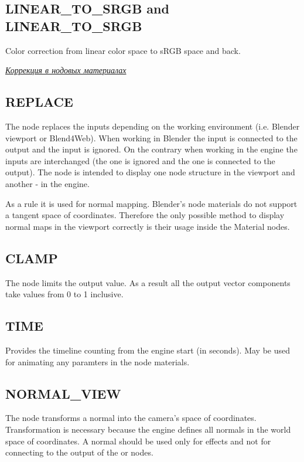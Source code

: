 \documentclass[a4paper,12pt,oneside]{sphinxmanual}
\begin{document}
\subsection{LINEAR\_TO\_SRGB and LINEAR\_TO\_SRGB}
\label{node_materials:linear-to-srgb-linear-to-srgb}
Color correction from linear color space to sRGB space and back.




{\hyperref[gamma_alpha:gamma-nodes]{\emph{Коррекция в нодовых материалах}}}




\subsection{REPLACE}
\label{node_materials:replace}
The node replaces the inputs depending on the working environment (i.e. Blender viewport or Blend4Web). When working in Blender the  input is connected to the  output and the  input is ignored. On the contrary when working in the engine the inputs are interchanged (the  one is ignored and the  one is connected to the output). The node is intended to display one node structure in the viewport and another - in the engine.

As a rule it is used for normal mapping. Blender's node materials do not support a tangent space of coordinates. Therefore the only possible method to display normal maps in the viewport correctly is their usage inside the Material nodes.


\subsection{CLAMP}
\label{node_materials:clamp}
The node limits the output value. As a result all the output vector components take values from 0 to 1 inclusive.


\subsection{TIME}
\label{node_materials:time}
Provides the timeline counting from the engine start (in seconds). May be used for animating any paramters in the node materials.


\subsection{NORMAL\_VIEW}
\label{node_materials:normal-view}
The node transforms a normal into the camera's space of coordinates. Transformation is necessary because the engine defines all normals in the world space of coordinates. A normal should be used only for effects and not for connecting to the output of the  or  nodes.
\end{document}
